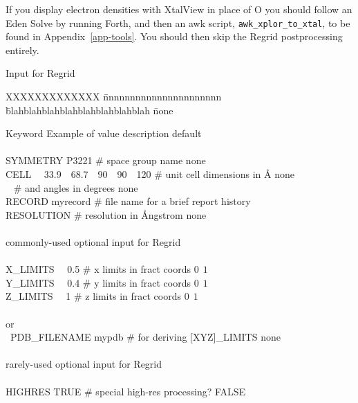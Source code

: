 \documentclass{report}
\begin{document}
{\vspace {0.1in}

If you display electron densities with XtalView in place of O 
you should follow an Eden Solve by running Forth, and then an awk script,
{\tt awk\_xplor\_to\_xtal}, to be found in Appendix~\ref{app-tools}.
You should then skip the Regrid postprocessing entirely. 

\begin{table}[hbt]
\caption {\large Input for Regrid}
\label{table-regrid}

\begin{tabbing}
XXXXXXXXXXXXX \= nnnnnnnnnnnnnnnnnnnnnn \= 
blahblahblahblahblahblahblahblah \= none \kill

Keyword \> Example of value \> description \> default \\
\\ 
SYMMETRY \> P3221 \> \# space group name \>  none \\
CELL ~~33.9~~68.7~~90~~90~~120 \> \# unit cell dimensions in \AA  \> none \\
\ \> \> \# and angles in degrees \> none \\
RECORD \> myrecord \> \# file name for a brief report \> history \\
RESOLUTION  \> \# resolution in \AA ngstrom \> none \\
\\
\> commonly-used optional input for Regrid  \> \\
\\
X\_LIMITS ~~0.5 \> \# x limits in fract coords \> $0~~ 1$ \\
Y\_LIMITS ~~0.4 \> \# y limits in fract coords \> $0~~ 1$ \\
Z\_LIMITS ~~1  \> \# z limits in fract coords \> $0~~ 1$ \\
\\
\> or  \> \\
\
PDB\_FILENAME \>  mypdb  \> \# for deriving [XYZ]\_LIMITS \> none  \\
\\
\> rarely-used optional input for Regrid  \> \\
\\
HIGHRES \> TRUE \> \# special high-res processing? \> FALSE \\
\\

\end{tabbing} 
\end{table}

}
\end{document}
